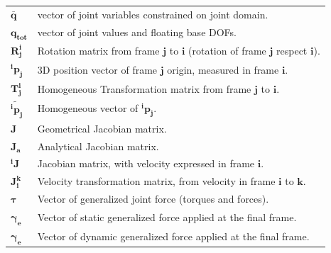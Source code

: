 \begin{table}[H]
\begin{tabular}{ll}
        ${\mathbf{\bar{q}}}$ & vector of joint variables constrained on joint domain.\\[2pt]
        ${\mathbf{q_{tot}}}$ & vector of joint values and floating base DOFs.\\[2pt]
        ${\mathbf{R^i_j}}$ & Rotation matrix from frame $\mathbf{j}$ to $\mathbf{i}$ (rotation of frame $\mathbf{j}$ respect $\mathbf{i}$).\\[2pt]
        ${\mathbf{^i p_j}}$ & 3D position vector of frame $\mathbf{j}$ origin, measured in frame $\mathbf{i}$.\\[2pt]
        ${\mathbf{T^i_j}}$ & Homogeneous Transformation matrix from frame $\mathbf{j}$ to $\mathbf{i}$.\\[2pt]
        ${\mathbf{\tilde{^ip_j}}}$ & Homogeneous vector of $\mathbf{^ip_j}$.\\[2pt]
        $\mathbf{J}$ & Geometrical Jacobian matrix.\\[2pt]
        $\mathbf{J_a}$ & Analytical Jacobian matrix.\\[2pt]
        $\mathbf{^i J}$ & Jacobian matrix, with velocity expressed in frame $\mathbf{i}$.\\[2pt]
        $\mathbf{J^k_i}$ & Velocity transformation matrix, from velocity in frame $\mathbf{i}$ to $\mathbf{k}$.\\[2pt]
        $\mathbf{\tau}$ & Vector of generalized joint force (torques and forces).\\[2pt]
        $\mathbf{\gamma_e}$ & Vector of static generalized force applied at the final frame.\\[2pt]        
        $\mathbf{\gamma_e}$ & Vector of dynamic generalized force applied at the final frame.\\[2pt]
    \end{tabular}
\end{table}
\newpage
